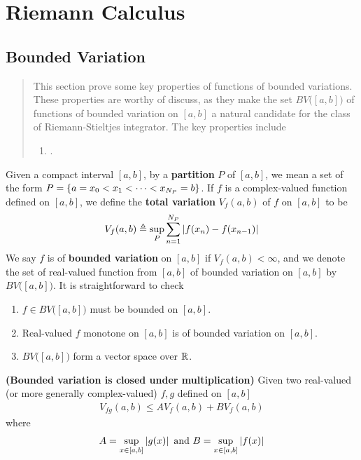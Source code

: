 \documentclass{report}
\begin{document}
\chapter{Riemann Calculus}
\section{Bounded Variation}
\begin{abstract}
This section prove some key properties of functions of bounded variations. These properties are worthy of discuss, as they make the set $BV\big([a,b] \big)$ of functions of bounded variation on $[a,b]$ a natural candidate for the class of Riemann-Stieltjes integrator. The key properties include 
\begin{enumerate}[label=(\alph*)]
  \item {}.  
\end{enumerate}
\end{abstract}
\begin{mdframed}
 Given a compact interval $[a,b]$, by a \textbf{partition} $P$ of $[a,b]$, we mean a set of the form $P=\{ a=x_0<x_1 < \cdots  < x_{N_P} =b \}$. If $f$ is a complex-valued function defined on $[a,b]$, we define the \textbf{total variation} $V_f(a,b)$ of $f$ on  $[a,b]$ to be 
\begin{align*}
V_f(a,b)\triangleq \sup_P \sum_{n=1}^{N_P} \left|f(x_n)-f(x_{n-1})\right|
\end{align*}
We say $f$ is of \textbf{bounded variation} on $[a,b]$ if $V_f(a,b)<\infty$, and we denote the set of real-valued function from $[a,b]$ of bounded variation on $[a,b]$ by $BV\big([a,b] \big)$.  It is straightforward to check 
\begin{enumerate}[label=(\alph*)]
  \item  $f \in BV\big([a,b] \big)$ must be bounded on $[a,b]$. 
  \item Real-valued $f$ monotone on $[a,b]$ is of bounded variation on $[a,b]$. 
  \item $BV\big([a,b] \big)$ form a vector space over $\mathbb{R}$. 
\end{enumerate}
\end{mdframed}
\begin{theorem}
\textbf{(Bounded variation is closed under multiplication)} Given two real-valued (or more generally complex-valued) $f,g$  defined on $[a,b]$ 
\begin{align*}
V_{fg}(a,b)\leq AV_f(a,b)+BV_f(a,b)
\end{align*}
where 
\begin{align*}
A= \sup_{x \in [a,b]}\left|g(x)\right|\text{ and }B=\sup_{x\in [a,b]}\left|f(x)\right|
\end{align*}
\end{theorem}
\end{document}
